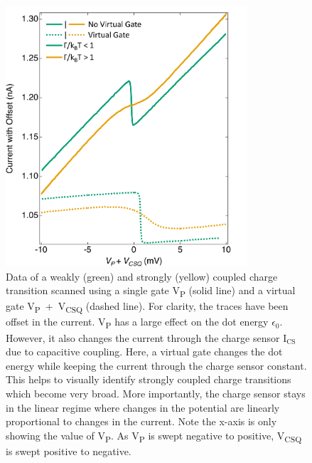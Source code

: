 \begin{figure}[!htb]
 \begin{center}
  \includegraphics[width=0.8\textwidth]{figures/ch1/figure8.pdf}
  \caption[Effects of a Virtual Gate]{\label{fig:ch1/virtual_gate_example} 
  Data of a weakly (green) and strongly (yellow) coupled charge transition scanned using a single gate V\textsubscript{P} (solid line) and a virtual gate V\textsubscript{P}~+~V\textsubscript{CSQ} (dashed line). For clarity, the traces have been offset in the current. V\textsubscript{P} has a large effect on the dot energy $\epsilon_0$. However, it also changes the current through the charge sensor $\mathrm{I_{CS}}$ due to capacitive coupling. Here, a virtual gate changes the dot energy while keeping the current through the charge sensor constant. This helps to visually identify strongly coupled charge transitions which become very broad. More importantly, the charge sensor stays in the linear regime where changes in the potential are linearly proportional to changes in the current. Note the x-axis is only showing the value of V\textsubscript{P}. As V\textsubscript{P} is swept negative to positive, V\textsubscript{CSQ} is swept positive to negative.}
 \end{center}
\end{figure}


